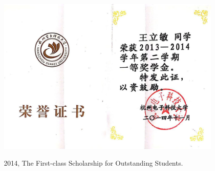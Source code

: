 \documentclass[11pt]{article}
\begin{document}
\begin{figure}[ht]
	\centering
	\includegraphics[width=14cm]{fig/cer8.jpg}\\
	\caption{2014, The First-class Scholarship for Outstanding Students.}
\end{figure}

\end{document}
